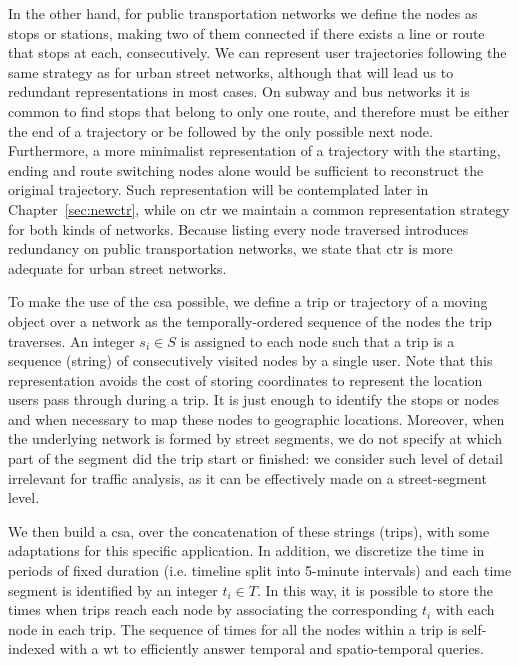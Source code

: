 	In the other hand, for public transportation networks we define the nodes as stops or stations, making two of them connected if there exists a line or route that stops at each, consecutively. We can represent user trajectories following the same strategy as for urban street networks, although that will lead us to redundant representations in most cases. On subway and bus networks it is common to find stops that belong to only one route, and therefore must be either the end of a trajectory or be followed by the only possible next node. Furthermore, a more minimalist representation of a trajectory with the starting, ending and route switching nodes alone would be sufficient to reconstruct the original trajectory. Such representation will be contemplated later in Chapter~\ref{sec:newctr}, while on \gls{ctr} we maintain a common representation strategy for both kinds of networks. Because listing every node traversed introduces redundancy on public transportation networks, we state that \gls{ctr} is more adequate for urban street networks.
    
	
	To make the
	use of the \gls{csa} possible, we define a trip or trajectory of a moving object
	over a network as the temporally-ordered sequence of the nodes the trip
	traverses. An integer $s_i \in S$ is assigned to each node such that a trip is a sequence (string) of consecutively visited nodes by a single user. Note that this representation avoids the cost of storing coordinates to represent the location users pass through during a trip. It is just enough to identify the stops or nodes and when necessary to map these nodes to geographic locations. Moreover, when the underlying network is formed by street segments, we do not specify at which part of the segment did the trip start or finished: we consider such level of detail irrelevant for traffic analysis, as it can be effectively made on a street-segment level.
	
	We then build a \gls{csa}, over the concatenation of
	these strings (trips), with some adaptations for this
	specific application. In addition, we discretize the time in periods of fixed
	duration (i.e. timeline split into 5-minute intervals) and each time
	segment is identified by an integer $t_i \in T$. In this way, it is possible
	to store the times when trips reach each node by associating the
	corresponding $t_i$ with each node in each trip. The sequence of
	times for all the nodes within a trip is self-indexed with a \gls{wt}
	to efficiently answer temporal and spatio-temporal queries.


